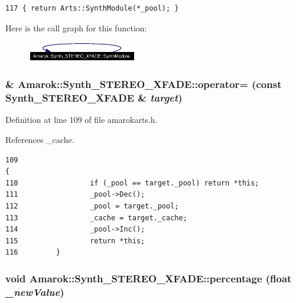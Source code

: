 \footnotesize\begin{verbatim}117 { return Arts::SynthModule(*_pool); }
\end{verbatim}\normalsize 


Here is the call graph for this function:\begin{figure}[H]
\begin{center}
\leavevmode
\includegraphics[width=135pt]{classAmarok_1_1Synth__STEREO__XFADE_Amarok_1_1Synth__STEREO__XFADEa7_cgraph}
\end{center}
\end{figure}
\subsubsection{\& Amarok::Synth\_\-STEREO\_\-XFADE::operator= (const {\bf Synth\_\-STEREO\_\-XFADE} \& {\em target})\hspace{0.3cm}{\tt  [inline]}}\label{classAmarok_1_1Synth__STEREO__XFADE_Amarok_1_1Synth__STEREO__XFADEa6}




Definition at line 109 of file amarokarts.h.

References \_\-cache.



\footnotesize\begin{verbatim}109                                                                                {
110                 if (_pool == target._pool) return *this;
111                 _pool->Dec();
112                 _pool = target._pool;
113                 _cache = target._cache;
114                 _pool->Inc();
115                 return *this;
116         }
\end{verbatim}\normalsize 
{}
\subsubsection{\setlength{\rightskip}{0pt plus 5cm}void Amarok::Synth\_\-STEREO\_\-XFADE::percentage (float {\em \_\-new\-Value})\hspace{0.3cm}{\tt  [inline]}}\label{classAmarok_1_1Synth__STEREO__XFADE_Amarok_1_1Synth__STEREO__XFADEa16}




